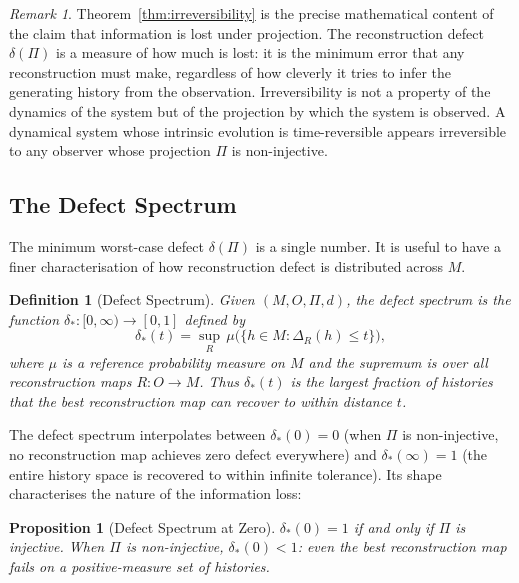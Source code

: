 \documentclass[12pt,a4paper]{article}
\newtheorem{proposition}[theorem]{Proposition}
\newtheorem{definition}[theorem]{Definition}
\theoremstyle{remark}
\newtheorem{remark}{Remark}[section]
\theoremstyle{definition}
\begin{document}
\begin{remark}
Theorem~\ref{thm:irreversibility} is the precise mathematical content of
the claim that information is lost under projection. The reconstruction
defect $\delta(\Pi)$ is a measure of how much is lost: it is the minimum
error that any reconstruction must make, regardless of how cleverly it
tries to infer the generating history from the observation. Irreversibility
is not a property of the dynamics of the system but of the projection by
which the system is observed. A dynamical system whose intrinsic evolution
is time-reversible appears irreversible to any observer whose projection
$\Pi$ is non-injective.
\end{remark}

\subsection{The Defect Spectrum}

The minimum worst-case defect $\delta(\Pi)$ is a single number. It is
useful to have a finer characterisation of how reconstruction defect is
distributed across $M$.

\begin{definition}[Defect Spectrum]
Given $(M, O, \Pi, d)$, the \emph{defect spectrum} is the function
$\delta_* : [0,\infty) \to [0,1]$ defined by
\begin{equation}
  \delta_*(t) = \sup_R\, \mu\!\bigl(\{h \in M : \Delta_R(h) \leq t\}\bigr),
\end{equation}
where $\mu$ is a reference probability measure on $M$ and the supremum
is over all reconstruction maps $R : O \to M$. Thus $\delta_*(t)$ is
the largest fraction of histories that the best reconstruction map can
recover to within distance $t$.
\end{definition}

The defect spectrum interpolates between $\delta_*(0) = 0$ (when $\Pi$
is non-injective, no reconstruction map achieves zero defect everywhere)
and $\delta_*(\infty) = 1$ (the entire history space is recovered to
within infinite tolerance). Its shape characterises the nature of the
information loss:

\begin{proposition}[Defect Spectrum at Zero]
$\delta_*(0) = 1$ if and only if $\Pi$ is injective. When $\Pi$ is
non-injective, $\delta_*(0) < 1$: even the best reconstruction map fails
on a positive-measure set of histories.
\end{proposition}
\end{document}
